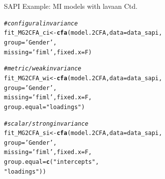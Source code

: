 \documentclass[10pt]{beamer}\usepackage[]{graphicx}\usepackage[]{xcolor}
\makeatletter
\newcommand{\hlstr}[1]{\textcolor[rgb]{0.192,0.494,0.8}{#1}}%
\newcommand{\hlcom}[1]{\textcolor[rgb]{0.678,0.584,0.686}{\textit{#1}}}%
\newcommand{\hlstd}[1]{\textcolor[rgb]{0.345,0.345,0.345}{#1}}%
\newcommand{\hlkwb}[1]{\textcolor[rgb]{0.69,0.353,0.396}{#1}}%
\newcommand{\hlkwc}[1]{\textcolor[rgb]{0.333,0.667,0.333}{#1}}%
\newcommand{\hlkwd}[1]{\textcolor[rgb]{0.737,0.353,0.396}{\textbf{#1}}}%
\newenvironment{kframe}{%
 \def\at@end@of@kframe{}%
 \ifinner\ifhmode%
  \def\at@end@of@kframe{\end{minipage}}%
  \begin{minipage}{\columnwidth}%
 \fi\fi%
 \def\FrameCommand##1{\hskip\@totalleftmargin \hskip-\fboxsep
 \colorbox{shadecolor}{##1}\hskip-\fboxsep
     \hskip-\linewidth \hskip-\@totalleftmargin \hskip\columnwidth}%
 \MakeFramed {\advance\hsize-\width
   \@totalleftmargin\z@ \linewidth\hsize
   \@setminipage}}%
 {\par\unskip\endMakeFramed%
 \at@end@of@kframe}
\newenvironment{knitrout}{}{} %
\makeatother
\begin{document}
\begin{frame}[fragile]{SAPI Example: MI models with lavaan Ctd.}

\begin{knitrout}
\color{fgcolor}\begin{kframe}
\begin{alltt}
\hlcom{# configural invariance}
\hlstd{fit_MG2CFA_ci} \hlkwb{<-} \hlkwd{cfa}\hlstd{(model.2CFA,} \hlkwc{data}\hlstd{=data_sapi,}
                     \hlkwc{group} \hlstd{=} \hlstr{'Gender'}\hlstd{,}
                     \hlkwc{missing}\hlstd{=}\hlstr{'fiml'}\hlstd{,} \hlkwc{fixed.x}\hlstd{=F)}

\hlcom{# metric/weak invariance}
\hlstd{fit_MG2CFA_wi} \hlkwb{<-} \hlkwd{cfa}\hlstd{(model.2CFA,} \hlkwc{data}\hlstd{=data_sapi,}
                     \hlkwc{group} \hlstd{=} \hlstr{'Gender'}\hlstd{,}
                     \hlkwc{missing}\hlstd{=}\hlstr{'fiml'}\hlstd{,} \hlkwc{fixed.x}\hlstd{=F,}
                     \hlkwc{group.equal} \hlstd{=} \hlstr{"loadings"}\hlstd{)}

\hlcom{# scalar/strong invariance}
\hlstd{fit_MG2CFA_si} \hlkwb{<-} \hlkwd{cfa}\hlstd{(model.2CFA,} \hlkwc{data}\hlstd{=data_sapi,}
                     \hlkwc{group} \hlstd{=} \hlstr{'Gender'}\hlstd{,}
                     \hlkwc{missing}\hlstd{=}\hlstr{'fiml'}\hlstd{,} \hlkwc{fixed.x}\hlstd{=F,}
                     \hlkwc{group.equal} \hlstd{=} \hlkwd{c}\hlstd{(}\hlstr{"intercepts"}\hlstd{,}
                                     \hlstr{"loadings"}\hlstd{))}
\end{alltt}
\end{kframe}
\end{knitrout}

\end{frame}
%
\end{document}
